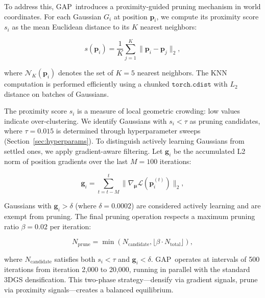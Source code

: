 \documentclass{egPublStyle}
\newcommand{\gap}{GAP}
\begin{document}
To address this, \gap\ introduces a proximity-guided pruning mechanism in world coordinates. For each Gaussian $G_i$ at position $\mathbf{p}_i$, we compute its proximity score $s_i$ as the mean Euclidean distance to its $K$ nearest neighbors:

\begin{equation}
s(\mathbf{p}_i) = \frac{1}{K} \sum_{j=1}^{K} \|\mathbf{p}_i - \mathbf{p}_j\|_2,
\label{eq:gap_proximity}
\end{equation}

where $\mathcal{N}_K(\mathbf{p}_i)$ denotes the set of $K=5$ nearest neighbors. The KNN computation is performed efficiently using a chunked $\texttt{torch.cdist}$ with $L_2$ distance on batches of Gaussians.

The proximity score $s_i$ is a measure of local geometric crowding: low values indicate over-clustering. We identify Gaussians with $s_i < \tau$ as pruning candidates, where $\tau = 0.015$ is determined through hyperparameter sweeps (Section~\ref{sec:hyperparams}). To distinguish actively learning Gaussians from settled ones, we apply gradient-aware filtering. Let $\mathbf{g}_i$ be the accumulated L2 norm of position gradients over the last $M=100$ iterations:

\begin{equation}
\mathbf{g}_i = \sum_{t=t-M}^{t} \|\nabla_{\boldsymbol{\mu}} \mathcal{L}(\mathbf{p}_i^{(t)})\|_2,
\label{eq:gap_gradient}
\end{equation}

Gaussians with $\mathbf{g}_i > \delta$ (where $\delta = 0.0002$) are considered actively learning and are exempt from pruning. The final pruning operation respects a maximum pruning ratio $\beta = 0.02$ per iteration:

\begin{equation}
N_{\text{prune}} = \min\left(N_{\text{candidate}}, \lfloor \beta \cdot N_{\text{total}} \rfloor\right),
\label{eq:gap_prune}
\end{equation}

where $N_{\text{candidate}}$ satisfies both $s_i < \tau$ and $\mathbf{g}_i < \delta$. \gap\ operates at intervals of 500 iterations from iteration 2,000 to 20,000, running in parallel with the standard 3DGS densification. This two-phase strategy---densify via gradient signals, prune via proximity signals---creates a balanced equilibrium.
\end{document}
